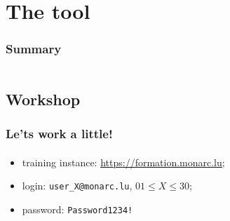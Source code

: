 %
%
\section{The tool}
\begin{frame}
    \frametitle{Summary}
    \begin{columns}[t]
        \begin{column}{5cm}
            \tableofcontents[sections={1-3}, currentsection, hideothersubsections]
        \end{column}
        \begin{column}{5cm}
            \tableofcontents[sections={4-5}, currentsection, hideothersubsections]
        \end{column}
    \end{columns}
\end{frame}
\subsection{Workshop}
\begin{frame}
    \frametitle{Le'ts work a little!}
    \framesubtitle{}
    \begin{itemize}
        \item training instance: \url{https://formation.monarc.lu};
        \item login: \texttt{user\_X@monarc.lu}, $01 \leq X \leq 30$;
        \item password: \texttt{Password1234!}
    \end{itemize}
\end{frame}
